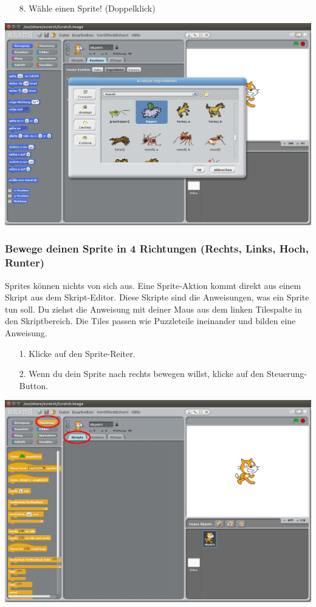 \begin{itemize}
\item[8.] Wähle einen  Sprite! (Doppelklick)
\end{itemize}

\includegraphics[width=\textwidth]{images/aufgabe1_tiere.png}

\subsubsection{Bewege deinen Sprite in 4 Richtungen (Rechts, Links, Hoch, Runter)}

Sprites können nichts von sich aus. Eine Sprite-Aktion kommt direkt aus einem Skript aus dem Skript-Editor. Diese Skripte sind die Anweisungen, was ein Sprite tun soll. \newline
Du ziehst die Anweisung mit deiner Maus aus dem linken Tilespalte in den Skriptbereich. Die Tiles passen wie Puzzleteile ineinander und bilden eine Anweisung.


\begin{itemize}
\item[1.] Klicke auf den Sprite-Reiter.
\item[2.] Wenn du dein Sprite nach rechts bewegen willst, klicke auf den Steuerung-Button.
\end{itemize}
\includegraphics[width=\textwidth]{images/aufgabe1_steuerung.png}

